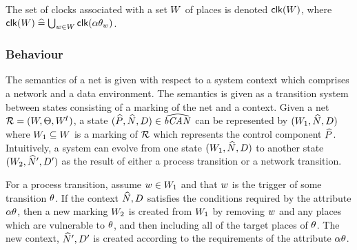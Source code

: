 The set of clocks associated with a set $W$ of places is denoted
${\mathop{\sf clk}}(W)$, where ${\mathop{\sf clk}}(W) \mathrel{\widehat=} \bigcup_{{w} \in W}
{\mathop{\sf clk}}(\alpha\theta_{w})$. 

\subsubsection{Behaviour}
The semantics of a net is given with respect to a system context which
comprises a network and a data environment. The semantics is given as
a transition system between states consisting of a marking of the net
and a context.  Given a net $\RR = (\W,\T,\WI)$, a state $({\widehat{P}},{\widehat{N}},{D})
\in {\widehat{{\text{\it bCAN\/}_{}}}}$ can be represented by $(W_1,{\widehat{N}},{D})$ where $W_1 \subseteq
W$ is a marking of $\RR$ which represents the control component
${\widehat{P}}$. Intuitively, a system can evolve from one state
$(W_1,{\widehat{N}},{D})$ to another state $(W_2,{\widehat{N}}',{D}')$ as the result of
either a process transition or a network transition.

For a process transition, assume ${w} \in W_1$ and that ${w}$ is the
trigger of some transition $\theta$.  If the context ${\widehat{N}}, {D}$ satisfies
the conditions required by the attribute $\alpha\theta$, then a new marking
$W_2$ is created from $W_1$ by removing ${w}$ and any places which
are vulnerable to $\theta$, and then including all of the target places 
of $\theta$. The new context, ${\widehat{N}}', {D}'$ is created according to the
requirements of the attribute $\alpha\theta$. 

